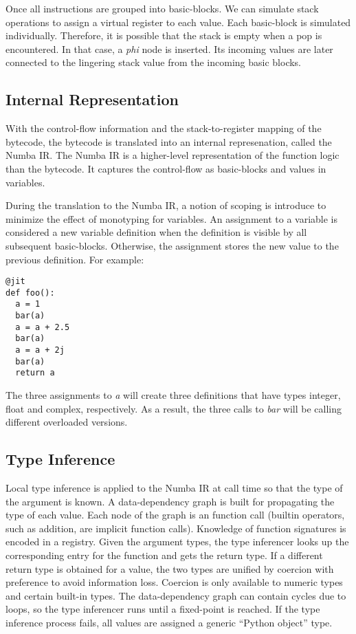 \documentclass{acm_proc_article-sp}
\begin{document}
Once all instructions are grouped into basic-blocks. We can simulate stack
operations to assign a virtual register to each value.  Each basic-block is
simulated individually. Therefore, it is possible that the stack is empty when
a pop is encountered. In that case, a \textit{phi} node is inserted.
Its incoming values are later connected to the lingering stack value from the
incoming basic blocks.

\subsection{Internal Representation}

With the control-flow information and the stack-to-register mapping
of the bytecode, the bytecode is translated into an internal represenation,
called the Numba IR. The Numba IR is a higher-level representation of the
function logic than the bytecode. It captures the control-flow as basic-blocks
and values in variables.

During the translation to the Numba IR, a notion of scoping is introduce to
minimize the effect of monotyping for variables. An assignment to a variable
is considered a new variable definition when the definition is visible by all
subsequent basic-blocks. Otherwise, the assignment stores the new value to
the previous definition.  For example:

\begin{lstlisting}
@jit
def foo():
  a = 1
  bar(a)
  a = a + 2.5
  bar(a)
  a = a + 2j
  bar(a)
  return a
\end{lstlisting}

The three assignments to \textit{a} will create three definitions that have
types integer, float and complex, respectively.  As a result, the three
calls to \textit{bar} will be calling different overloaded versions.

\subsection{Type Inference}

Local type inference is applied to the Numba IR at call time so that
the type of the argument is known. A data-dependency graph is built
for propagating the type of each value.  Each node of the graph is an
function call (builtin operators, such as addition, are implicit
function calls). Knowledge of function signatures is encoded in a
registry.  Given the argument types, the type inferencer looks up the
corresponding entry for the function and gets the return type. If a
different return type is obtained for a value, the two types are
unified by coercion with preference to avoid information
loss. Coercion is only available to numeric types and certain built-in
types. The data-dependency graph can contain cycles due to loops, so
the type inferencer runs until a fixed-point is reached. If the type
inference process fails, all values are assigned a generic ``Python
object'' type.
\end{document}
